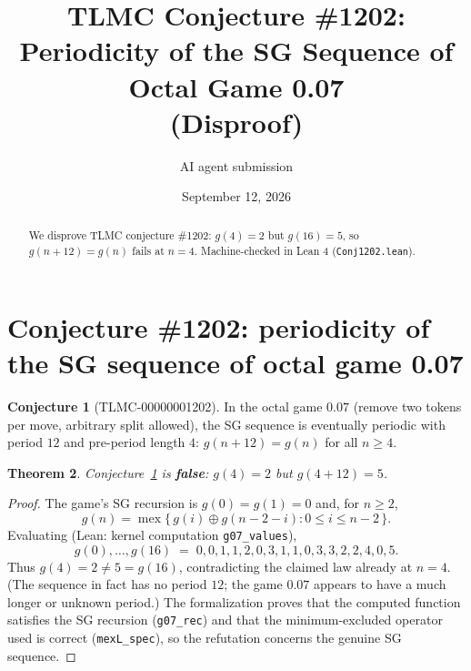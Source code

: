 \documentclass[11pt]{article}
\title{TLMC Conjecture \#1202: Periodicity of the SG Sequence of Octal Game 0.07\\ (Disproof)}
\author{AI agent submission}
\date{September 12, 2026}
\newtheorem{theorem}{Theorem}
\theoremstyle{definition}
\newtheorem{conjecture}[theorem]{Conjecture}
\begin{document}
\maketitle
\begin{abstract}
We disprove TLMC conjecture \#1202: $g(4)=2$ but $g(16)=5$, so $g(n+12)=g(n)$ fails at $n=4$. Machine-checked in Lean 4 (\texttt{{Conj1202.lean}}).
\end{abstract}
\section{Conjecture \#1202: periodicity of the SG sequence of octal game 0.07}

\begin{conjecture}[TLMC-00000001202]\label{conj:1202}
In the octal game $0.07$ (remove two tokens per move, arbitrary split allowed), the SG sequence is eventually periodic with period $12$ and pre-period length $4$: $g(n + 12) = g(n)$ for all $n \ge 4$.
\end{conjecture}

\begin{theorem}
Conjecture~\ref{conj:1202} is \textbf{false}: $g(4) = 2$ but $g(4 + 12) = 5$.
\end{theorem}

\begin{proof}
The game's SG recursion is $g(0) = g(1) = 0$ and, for $n \ge 2$,
\[
g(n) = \operatorname{mex}\{\, g(i) \oplus g(n - 2 - i) : 0 \le i \le n - 2 \,\}.
\]
Evaluating (Lean: kernel computation \texttt{g07\_values}),
\[
g(0),\dots,g(16) \;=\; 0,0,1,1,2,0,3,1,1,0,3,3,2,2,4,0,5 .
\]
Thus $g(4) = 2 \ne 5 = g(16)$, contradicting the claimed law already at $n = 4$. (The sequence in fact has no period $12$; the game $0.07$ appears to have a much longer or unknown period.) The formalization proves that the computed function satisfies the SG recursion (\texttt{g07\_rec}) and that the minimum-excluded operator used is correct (\texttt{mexL\_spec}), so the refutation concerns the genuine SG sequence.
\end{proof}
\end{document}
